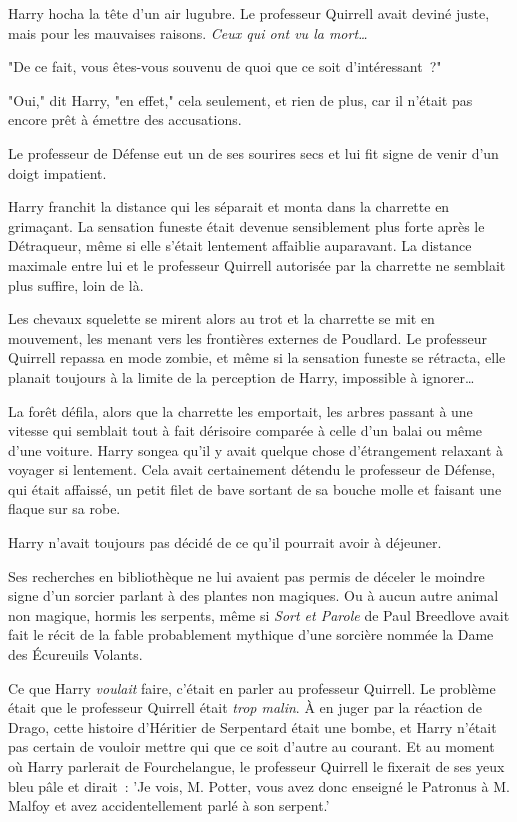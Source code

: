 Harry hocha la tête d'un air lugubre. Le professeur Quirrell avait deviné juste, mais pour les mauvaises raisons. \emph{Ceux qui ont vu la mort…}

"De ce fait, vous êtes-vous souvenu de quoi que ce soit d'intéressant~?"

"Oui," dit Harry, "en effet," cela seulement, et rien de plus, car il n'était pas encore prêt à émettre des accusations.

Le professeur de Défense eut un de ses sourires secs et lui fit signe de venir d'un doigt impatient.

Harry franchit la distance qui les séparait et monta dans la charrette en grimaçant. La sensation funeste était devenue sensiblement plus forte après le Détraqueur, même si elle s'était lentement affaiblie auparavant. La distance maximale entre lui et le professeur Quirrell autorisée par la charrette ne semblait plus suffire, loin de là.

Les chevaux squelette se mirent alors au trot et la charrette se mit en mouvement, les menant vers les frontières externes de Poudlard. Le professeur Quirrell repassa en mode zombie, et même si la sensation funeste se rétracta, elle planait toujours à la limite de la perception de Harry, impossible à ignorer…

La forêt défila, alors que la charrette les emportait, les arbres passant à une vitesse qui semblait tout à fait dérisoire comparée à celle d'un balai ou même d'une voiture. Harry songea qu'il y avait quelque chose d'étrangement relaxant à voyager si lentement. Cela avait certainement détendu le professeur de Défense, qui était affaissé, un petit filet de bave sortant de sa bouche molle et faisant une flaque sur sa robe.

Harry n'avait toujours pas décidé de ce qu'il pourrait avoir à déjeuner.

Ses recherches en bibliothèque ne lui avaient pas permis de déceler le moindre signe d'un sorcier parlant à des plantes non magiques. Ou à aucun autre animal non magique, hormis les serpents, même si \emph{Sort et Parole} de Paul Breedlove avait fait le récit de la fable probablement mythique d'une sorcière nommée la Dame des Écureuils Volants.

Ce que Harry \emph{voulait} faire, c'était en parler au professeur Quirrell. Le problème était que le professeur Quirrell était \emph{trop malin}. À en juger par la réaction de Drago, cette histoire d'Héritier de Serpentard était une bombe, et Harry n'était pas certain de vouloir mettre qui que ce soit d'autre au courant. Et au moment où Harry parlerait de Fourchelangue, le professeur Quirrell le fixerait de ses yeux bleu pâle et dirait~: 'Je vois, M. Potter, vous avez donc enseigné le Patronus à M. Malfoy et avez accidentellement parlé à son serpent.'

